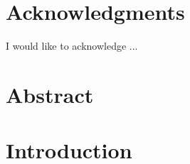 \documentclass[12pt,english]{report}
\begin{document}
\chapter*{Acknowledgments}
\egroup
{}%

\begin{onehalfspace}

I would like to acknowledge ...

\end{onehalfspace}

\newpage

\begin{singlespace}
\tableofcontents
\end{singlespace}
\newpage

\listoftables
\newpage

\listoffigures
\newpage


\renewcommand{\nomname}{Nomenclature}
\begin{singlespace}
\printnomenclature[3cm] %
\end{singlespace}

\newpage
\bgroup
\titleformat{\chapter}{}{}{0pt}{\normalfont\Large\bfseries}
\titlespacing*{\chapter}{0pt}{0pt}{20pt}
\chapter*{Abstract}
\egroup
{}%

\begin{onehalfspace}

\noindent %
\blindtext

\end{onehalfspace}

\titlespacing*{\chapter}{0pt}{50pt}{40pt}

\chapter{Introduction} \label{c:intro}
    
\end{document}
